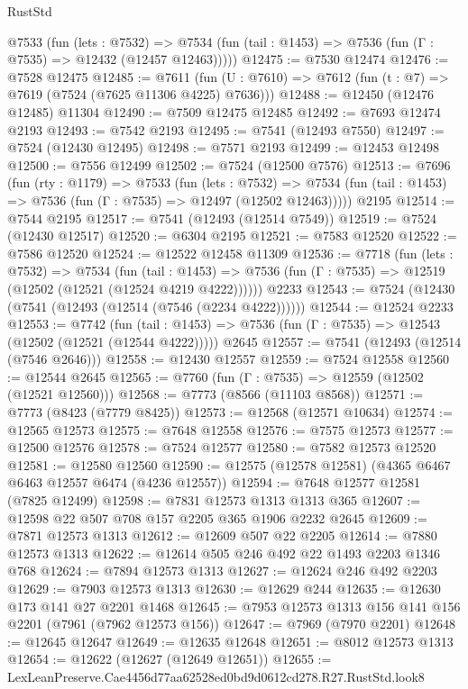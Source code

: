 \begin{lexlean}{RustStd}
\begin{coremodule}
    @7533
      (fun (lets : @7532) =>
      @7534 (fun (tail : @1453) => @7536 (fun (Γ : @7535) => @12432 (@12457 @12463)))))
@12475 := @7530 @12474
@12476 := @7528 @12475
@12485 := @7611
    (fun (U : @7610) => @7612 (fun (t : @7) => @7619 (@7524 (@7625 @11306 @4225) @7636)))
@12488 := @12450 (@12476 @12485) @11304
@12490 := @7509 @12475 @12485
@12492 := @7693 @12474 @2193
@12493 := @7542 @2193
@12495 := @7541 (@12493 @7550)
@12497 := @7524 (@12430 @12495)
@12498 := @7571 @2193
@12499 := @12453 @12498
@12500 := @7556 @12499
@12502 := @7524 (@12500 @7576)
@12513 := @7696
    (fun (rty : @1179) =>
    @7533
      (fun (lets : @7532) =>
      @7534 (fun (tail : @1453) => @7536 (fun (Γ : @7535) => @12497 (@12502 @12463)))))
    @2195
@12514 := @7544 @2195
@12517 := @7541 (@12493 (@12514 @7549))
@12519 := @7524 (@12430 @12517)
@12520 := @6304 @2195
@12521 := @7583 @12520
@12522 := @7586 @12520
@12524 := @12522 @12458 @11309
@12536 := @7718
    (fun (lets : @7532) =>
    @7534
      (fun (tail : @1453) =>
      @7536 (fun (Γ : @7535) => @12519 (@12502 (@12521 (@12524 @4219 @4222))))))
    @2233
@12543 := @7524 (@12430 (@7541 (@12493 (@12514 (@7546 (@2234 @4222))))))
@12544 := @12524 @2233
@12553 := @7742
    (fun (tail : @1453) => @7536 (fun (Γ : @7535) => @12543 (@12502 (@12521 (@12544 @4222)))))
    @2645
@12557 := @7541 (@12493 (@12514 (@7546 @2646)))
@12558 := @12430 @12557
@12559 := @7524 @12558
@12560 := @12544 @2645
@12565 := @7760 (fun (Γ : @7535) => @12559 (@12502 (@12521 @12560)))
@12568 := @7773 (@8566 (@11103 @8568))
@12571 := @7773 (@8423 (@7779 @8425))
@12573 := @12568 (@12571 @10634)
@12574 := @12565 @12573
@12575 := @7648 @12558
@12576 := @7575 @12573
@12577 := @12500 @12576
@12578 := @7524 @12577
@12580 := @7582 @12573 @12520
@12581 := @12580 @12560
@12590 := @12575 (@12578 @12581) (@4365 @6467 @6463 @12557 @6474 (@4236 @12557))
@12594 := @7648 @12577 @12581 (@7825 @12499)
@12598 := @7831 @12573 @1313 @1313 @365
@12607 := @12598 @22 @507 @708 @157 @2205 @365 @1906 @2232 @2645
@12609 := @7871 @12573 @1313
@12612 := @12609 @507 @22 @2205
@12614 := @7880 @12573 @1313
@12622 := @12614 @505 @246 @492 @22 @1493 @2203 @1346 @768
@12624 := @7894 @12573 @1313
@12627 := @12624 @246 @492 @2203
@12629 := @7903 @12573 @1313
@12630 := @12629 @244
@12635 := @12630 @173 @141 @27 @2201 @1468
@12645 := @7953 @12573 @1313 @156 @141 @156 @2201 (@7961 (@7962 @12573 @156))
@12647 := @7969 (@7970 @2201)
@12648 := @12645 @12647
@12649 := @12635 @12648
@12651 := @8012 @12573 @1313
@12654 := @12622 (@12627 (@12649 @12651))
@12655 := LexLeanPreserve.Cae4456d77aa62528ed0bd9d0612cd278.R27.RustStd.look8

\end{coremodule}
\end{lexlean}
